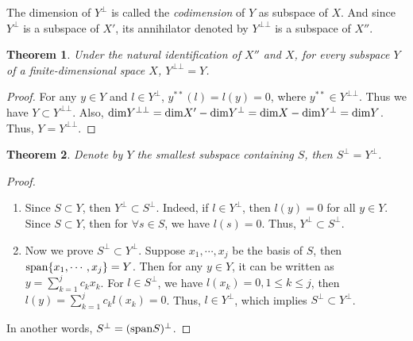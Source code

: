 \documentclass[10pt]{book}
\newtheorem{theorem}{Theorem}[chapter]
\theoremstyle{definition}
\numberwithin{equation}{chapter}
\begin{document}
\medskip

The dimension of $Y^\bot$ is called the \emph{codimension} of $Y$ as subspace of $X$. And since $Y^\bot$ is a subspace of $X'$, its annihilator denoted by $Y^{\bot \bot}$ is a subspace of $X''$.

\medskip

\begin{theorem}
Under the natural identification of $X''$ and $X$, for every subspace $Y$ of a finite-dimensional space $X$, $Y^{\bot\bot} = Y$.
\end{theorem}
\begin{proof}
For any $y\in Y$ and $l\in Y^\bot$, $y^{**}(l) = l(y) = 0$, where $y^{**} \in Y^{\bot\bot}$. Thus we have $Y\subset Y^{\bot\bot}$. Also, ${\rm dim}Y^{\bot\bot} = {\rm dim}X' - {\rm dim}Y^\bot = {\rm dim}X - {\rm dim}Y^\bot = {\rm dim}Y$. Thus, $Y = Y^{\bot\bot}$.
\end{proof}

\medskip

\begin{theorem}
Denote by $Y$ the smallest subspace containing $S$, then $S^\bot = Y^\bot$.
\end{theorem}
\begin{proof}
~\begin{enumerate}[label=(\alph*)]
    \item Since $S\subset Y$, then $Y^\bot\subset S^\bot$. Indeed, if $l\in Y^\bot$, then $l(y) = 0$ for all $y\in Y$. Since $S\subset Y$, then for $\forall s\in S$, we have $l(s) = 0$. Thus, $Y^\bot\subset S^\bot$. 
    \item Now we prove $S^\bot\subset Y^\bot$. Suppose $x_1,\cdots,x_j$ be the basis of $S$, then ${\rm span}\{x_1,\cdots,x_j\} = Y$. Then for any $y\in Y$, it can be written as $y = \sum^j_{k=1}c_k x_k$. For $l\in S^\bot$, we have $l(x_k) = 0, 1\leq k \leq j$, then $l(y) = \sum^j_{k=1}c_k l(x_k) = 0$. Thus, $l\in Y^\bot$, which implies $S^\bot\subset Y^\bot$. 
\end{enumerate}
In another words, $S^\bot = ({\rm span} S)^\bot$.
\end{proof}

\medskip
\end{document}
